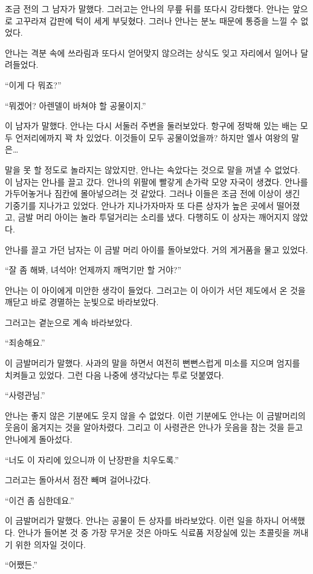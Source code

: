 조금 전의 그 남자가 말했다. 그러고는 안나의 무릎 뒤를 또다시 강타했다. 안나는 앞으로 고꾸라져 갑판에 턱이 세게 부딪혔다. 그러나 안나는 분노 때문에 통증을 느낄 수 없었다.

안나는 격분 속에 쓰라림과 또다시 얻어맞지 않으려는 상식도 잊고 자리에서 일어나 달려들었다.

``이게 다 뭐죠?''

``뭐겠어? 아렌델이 바쳐야 할 공물이지.''

이 남자가 말했다. 안나는 다시 서둘러 주변을 둘러보았다. 항구에 정박해 있는 배는 모두 언저리에까지 꽉 차 있었다. 이것들이 모두 공물이었을까? 하지만 엘사 여왕의 말은\ldots

말을 못 할 정도로 놀라지는 않았지만, 안나는 속았다는 것으로 말을 꺼낼 수 없었다. 이 남자는 안나를 끌고 갔다. 안나의 위팔에 빨갛게 손가락 모양 자국이 생겼다. 안나를 가두어놓거나 짐칸에 몰아넣으려는 것 같았다. 그러나 이들은 조금 전에 이상이 생긴 기중기를 지나가고 있었다. 안나가 지나가자마자 또 다른 상자가 높은 곳에서 떨어졌고, 금발 머리 아이는 놀라 투덜거리는 소리를 냈다. 다행히도 이 상자는 깨어지지 않았다.

안나를 끌고 가던 남자는 이 금발 머리 아이를 돌아보았다. 거의 게거품을 물고 있었다.

``잘 좀 해봐, 녀석아! 언제까지 깨먹기만 할 거야?''

안나는 이 아이에게 미안한 생각이 들었다. 그러고는 이 아이가 서던 제도에서 온 것을 깨닫고 바로 경멸하는 눈빛으로 바라보았다.

그러고는 곁눈으로 계속 바라보았다.

``죄송해요.''

이 금발머리가 말했다. 사과의 말을 하면서 여전히 뻔뻔스럽게 미소를 지으며 엄지를 치켜들고 있었다. 그런 다음 나중에 생각났다는 투로 덧붙였다.

``사령관님.''

안나는 좋지 않은 기분에도 웃지 않을 수 없었다. 이런 기분에도 안나는 이 금발머리의 웃음이 옮겨지는 것을 알아차렸다. 그리고 이 사령관은 안나가 웃음을 참는 것을 듣고 안나에게 돌아섰다.

``너도 이 자리에 있으니까 이 난장판을 치우도록.''

그러고는 돌아서서 점잔 빼며 걸어나갔다.

``이건 좀 심한데요.''

이 금발머리가 말했다. 안나는 공물이 든 상자를 바라보았다. 이런 일을 하자니 어색했다. 안나가 들어본 것 중 가장 무거운 것은 아마도 식료품 저장실에 있는 초콜릿을 꺼내기 위한 의자일 것이다.

``어쨌든.''

